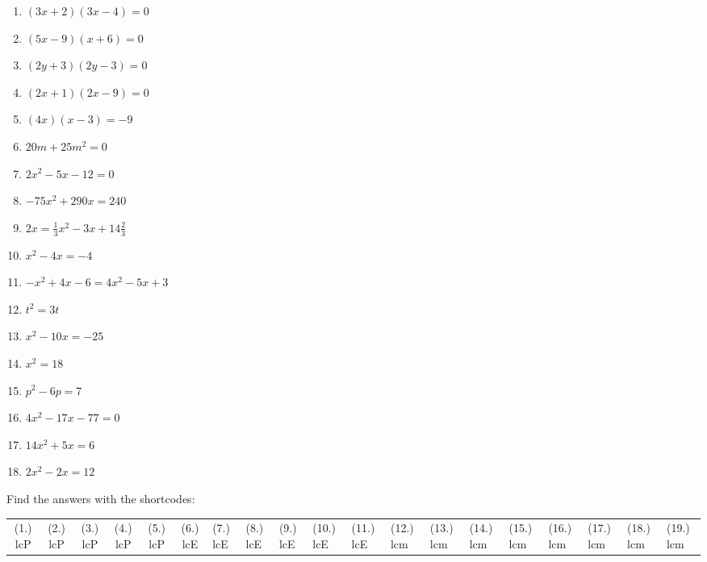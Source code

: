 \begin{exercises}{ }
{
\begin{multicols}{2}
\begin{enumerate}[noitemsep, label=\textbf{\arabic*}. ] 
\item  $(3x+2)(3x-4)=0$
\item  $(5x-9)(x+6)=0$
\item  $(2y+3)(2y-3)=0$ 
\item  $(2x+1)(2x-9)=0$    
\item  $(4x)(x-3)=-9$       
\item  $20m+25{m}^{2}=0$
\item  $2{x}^{2}-5x-12=0$  
\item  $-75{x}^{2}+290x=240$
\item  $2x=\frac{1}{3}{x}^{2}-3x+14\frac{2}{3}$
\item  ${x}^{2}-4x=-4$      
\item  $-{x}^{2}+4x-6=4{x}^{2}-5x+3$       
\item  ${t}^{2}=3t$  
\item  ${x}^{2}-10x=-25$      
\item  ${x}^{2}=18$
\item  ${p}^{2}-6p=7$
\item  $4{x}^{2}-17x-77=0$
\item  $14{x}^{2}+5x=6$
\item  $2{x}^{2}-2x=12$              
\end{enumerate}
\end{multicols}
\par {} Find the answers with the shortcodes:
\par\begin{tabular}[h]{cccccc}
(1.) lcP  &  (2.) lcP  &  (3.) lcP  &  (4.) lcP  &  (5.) lcP  &  (6.) lcE  &  (7.) lcE  &  (8.) lcE  &  (9.) lcE  &  (10.) lcE  &  (11.) lcE  &  (12.) lcm  &  (13.) lcm  &  (14.) lcm  &  (15.) lcm  &  (16.) lcm  &  (17.) lcm  &  (18.) lcm  &  (19.) lcm  & \end{tabular}
}
\end{exercises}

